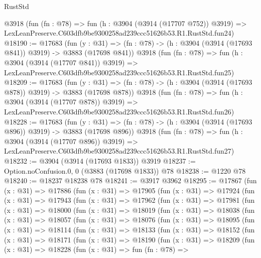 \begin{lexlean}{RustStd}
\begin{coremodule}
    @3918
    (fun (fn : @78) =>
    fun (h : @3904 (@3914 (@17707 @752)) @3919) =>
    LexLeanPreserve.C603dfb9be9300258ad239ccc51626b53.R1.RustStd.fun24)
@18190 := @17683
    (fun (y : @31) => (fn : @78) -> (h : @3904 (@3914 (@17693 @841)) @3919) -> @3883 (@17698 @841))
    @3918
    (fun (fn : @78) =>
    fun (h : @3904 (@3914 (@17707 @841)) @3919) =>
    LexLeanPreserve.C603dfb9be9300258ad239ccc51626b53.R1.RustStd.fun25)
@18209 := @17683
    (fun (y : @31) => (fn : @78) -> (h : @3904 (@3914 (@17693 @878)) @3919) -> @3883 (@17698 @878))
    @3918
    (fun (fn : @78) =>
    fun (h : @3904 (@3914 (@17707 @878)) @3919) =>
    LexLeanPreserve.C603dfb9be9300258ad239ccc51626b53.R1.RustStd.fun26)
@18228 := @17683
    (fun (y : @31) => (fn : @78) -> (h : @3904 (@3914 (@17693 @896)) @3919) -> @3883 (@17698 @896))
    @3918
    (fun (fn : @78) =>
    fun (h : @3904 (@3914 (@17707 @896)) @3919) =>
    LexLeanPreserve.C603dfb9be9300258ad239ccc51626b53.R1.RustStd.fun27)
@18232 := @3904 (@3914 (@17693 @1833)) @3919
@18237 := Option.noConfusion.{0, 0} (@3883 (@17698 @1833)) @78
@18238 := @1220 @78
@18240 := @18237 @18238 @78
@18241 := @3917 @3962
@18295 := @17867
    (fun (x : @31) =>
    @17886
      (fun (x : @31) =>
      @17905
        (fun (x : @31) =>
        @17924
          (fun (x : @31) =>
          @17943
            (fun (x : @31) =>
            @17962
              (fun (x : @31) =>
              @17981
                (fun (x : @31) =>
                @18000
                  (fun (x : @31) =>
                  @18019
                    (fun (x : @31) =>
                    @18038
                      (fun (x : @31) =>
                      @18057
                        (fun (x : @31) =>
                        @18076
                          (fun (x : @31) =>
                          @18095
                            (fun (x : @31) =>
                            @18114
                              (fun (x : @31) =>
                              @18133
                                (fun (x : @31) =>
                                @18152
                                  (fun (x : @31) =>
                                  @18171
                                    (fun (x : @31) =>
                                    @18190
                                      (fun (x : @31) =>
                                      @18209
                                        (fun (x : @31) =>
                                        @18228
                                          (fun (x : @31) =>
                                          fun (fn : @78) =>

\end{coremodule}
\end{lexlean}
